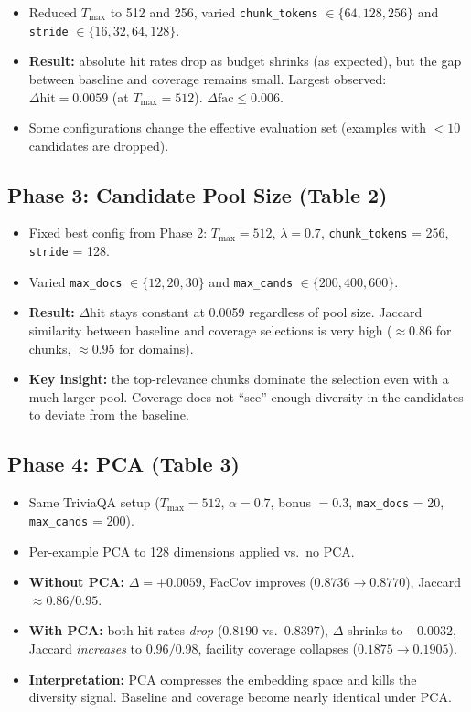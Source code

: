 \documentclass[11pt,a4paper]{article}
\begin{document}
\begin{itemize}[leftmargin=*]
	\item Reduced $T_{\max}$ to 512 and 256, varied \texttt{chunk\_tokens} $\in \{64, 128, 256\}$ and \texttt{stride} $\in \{16, 32, 64, 128\}$.
	\item \textbf{Result:} absolute hit rates drop as budget shrinks (as expected), but the gap between baseline and coverage remains small. Largest observed: $\Delta\text{hit} = 0.0059$ (at $T_{\max} = 512$). $\Delta\text{fac} \leq 0.006$.
	\item Some configurations change the effective evaluation set (examples with $<10$ candidates are dropped).
\end{itemize}

\subsection{Phase 3: Candidate Pool Size (Table 2)}

\begin{itemize}[leftmargin=*]
	\item Fixed best config from Phase 2: $T_{\max} = 512$, $\lambda = 0.7$, \texttt{chunk\_tokens} = 256, \texttt{stride} = 128.
	\item Varied \texttt{max\_docs} $\in \{12, 20, 30\}$ and \texttt{max\_cands} $\in \{200, 400, 600\}$.
	\item \textbf{Result:} $\Delta\text{hit}$ stays constant at 0.0059 regardless of pool size. Jaccard similarity between baseline and coverage selections is very high ($\approx 0.86$ for chunks, $\approx 0.95$ for domains).
	\item \textbf{Key insight:} the top-relevance chunks dominate the selection even with a much larger pool. Coverage does not ``see'' enough diversity in the candidates to deviate from the baseline.
\end{itemize}

\subsection{Phase 4: PCA (Table 3)}

\begin{itemize}[leftmargin=*]
	\item Same TriviaQA setup ($T_{\max} = 512$, $\alpha = 0.7$, bonus $= 0.3$, \texttt{max\_docs} = 20, \texttt{max\_cands} = 200).
	\item Per-example PCA to 128 dimensions applied vs.\ no PCA.
	\item \textbf{Without PCA:} $\Delta = +0.0059$, FacCov improves ($0.8736 \to 0.8770$), Jaccard $\approx 0.86/0.95$.
	\item \textbf{With PCA:} both hit rates \emph{drop} ($0.8190$ vs.\ $0.8397$), $\Delta$ shrinks to $+0.0032$, Jaccard \emph{increases} to $0.96/0.98$, facility coverage collapses ($0.1875 \to 0.1905$).
	\item \textbf{Interpretation:} PCA compresses the embedding space and kills the diversity signal. Baseline and coverage become nearly identical under PCA.
\end{itemize}
\end{document}
